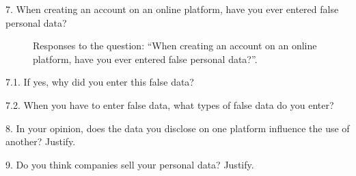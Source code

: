 7. When creating an account on an online platform, have you ever entered false personal data?

\begin{figure}[H]
    \begin{center}
        \caption{Responses to the question: ``When creating an account on an online platform, have you ever entered false personal data?''.}
        \label{fig:survey_s5_q7}
    \end{center}
\end{figure}

7.1. If yes, why did you enter this false data?

7.2. When you have to enter false data, what types of false data do you enter?

8. In your opinion, does the data you disclose on one platform influence the use of another? Justify.

9. Do you think companies sell your personal data? Justify.

